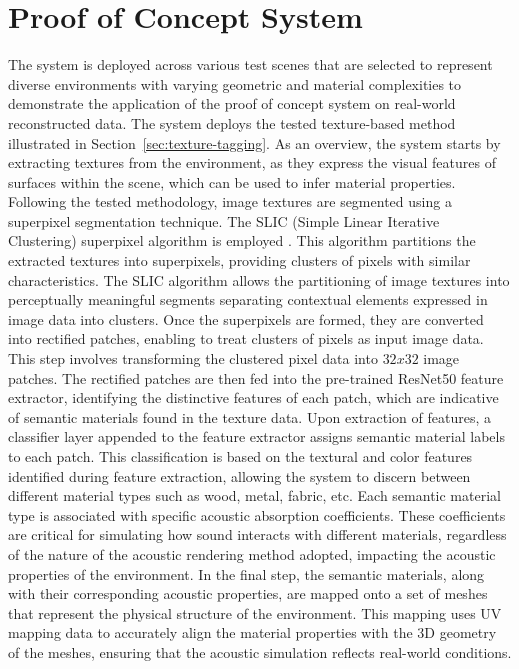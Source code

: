\section{Proof of Concept System}
The system is deployed across various test scenes that are selected to represent diverse environments with varying geometric and material complexities to demonstrate the application of the proof of concept system on real-world reconstructed data. The system deploys the tested texture-based method illustrated in Section~\ref{sec:texture-tagging}. As an overview, the system starts by extracting textures from the environment, as they express the visual features of surfaces within the scene, which can be used to infer material properties.
Following the tested methodology, image textures are segmented using a superpixel segmentation technique. The SLIC (Simple Linear Iterative Clustering) superpixel algorithm is employed \citep{slic6205760}. This algorithm partitions the extracted textures into superpixels, providing clusters of pixels with similar characteristics. The SLIC algorithm allows the partitioning of image textures into perceptually meaningful segments separating contextual elements expressed in image data into clusters. Once the superpixels are formed, they are converted into rectified patches, enabling  to treat clusters of pixels as input image data. This step involves transforming the clustered pixel data into $32x32$ image patches.
The rectified patches are then fed into the pre-trained ResNet50 feature extractor, identifying the distinctive features of each patch, which are indicative of semantic materials found in the texture data. Upon extraction of features, a classifier layer appended to the feature extractor assigns semantic material labels to each patch. This classification is based on the textural and color features identified during feature extraction, allowing the system to discern between different material types such as wood, metal, fabric, etc. Each semantic material type is associated with specific acoustic absorption coefficients. These coefficients are critical for simulating how sound interacts with different materials, regardless of the nature of the acoustic rendering method adopted, impacting the acoustic properties of the environment. In the final step, the semantic materials, along with their corresponding acoustic properties, are mapped onto a set of meshes that represent the physical structure of the environment. This mapping uses UV mapping data to accurately align the material properties with the 3D geometry of the meshes, ensuring that the acoustic simulation reflects real-world conditions.

